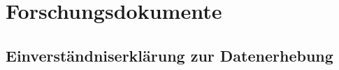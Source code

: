 \chapter{Forschungsdokumente}
\label{app:misc}



\section{Einverständniserklärung zur Datenerhebung}
\label{app:declaration-of-consent}


